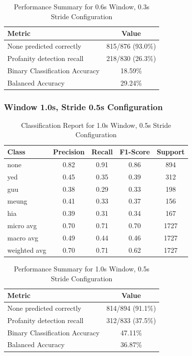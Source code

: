 \documentclass[11pt]{article}
\begin{document}
\begin{table}[H]
\centering
\caption{Performance Summary for 0.6s Window, 0.3s Stride Configuration}
\begin{tabular}{lc}
\toprule
\textbf{Metric} & \textbf{Value} \\
\midrule
None predicted correctly & 815/876 (93.0\%) \\
Profanity detection recall & 218/830 (26.3\%) \\
Binary Classification Accuracy & 18.59\% \\
Balanced Accuracy & 29.24\% \\
\bottomrule
\end{tabular}
\end{table}

\subsubsection{Window 1.0s, Stride 0.5s Configuration}

\begin{table}[H]
\centering
\caption{Classification Report for 1.0s Window, 0.5s Stride Configuration}
\begin{tabular}{lcccc}
\toprule
\textbf{Class} & \textbf{Precision} & \textbf{Recall} & \textbf{F1-Score} & \textbf{Support} \\
\midrule
none & 0.82 & 0.91 & 0.86 & 894 \\
yed & 0.45 & 0.35 & 0.39 & 312 \\
guu & 0.38 & 0.29 & 0.33 & 198 \\
meung & 0.41 & 0.33 & 0.37 & 156 \\
hia & 0.39 & 0.31 & 0.34 & 167 \\
\midrule
micro avg & 0.70 & 0.71 & 0.70 & 1727 \\
macro avg & 0.49 & 0.44 & 0.46 & 1727 \\
weighted avg & 0.70 & 0.71 & 0.62 & 1727 \\
\bottomrule
\end{tabular}
\end{table}

\begin{table}[H]
\centering
\caption{Performance Summary for 1.0s Window, 0.5s Stride Configuration}
\begin{tabular}{lc}
\toprule
\textbf{Metric} & \textbf{Value} \\
\midrule
None predicted correctly & 814/894 (91.1\%) \\
Profanity detection recall & 312/833 (37.5\%) \\
Binary Classification Accuracy & 47.11\% \\
Balanced Accuracy & 36.87\% \\
\bottomrule
\end{tabular}
\end{table}
\end{document}
